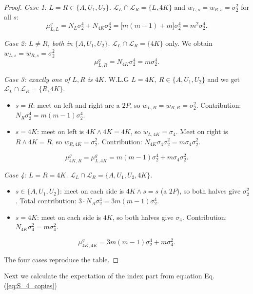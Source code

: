 \documentclass[12pt,a4paper]{article}
\begin{document}
\begin{proof}
\smallskip\noindent\emph{Case 1: $L=R\in\{A,U_{1},U_{2}\}$.}
$\mathcal L_{L}\cap\mathcal L_{R}=\{L,4K\}$ and $w_{L,s}=w_{R,s}=\sigma_{2}^{2}$ for all $s$:
\[
\mu^{g}_{L,L}=N_{L}\sigma_{2}^{4}+N_{4K}\sigma_{2}^{4}
=\bigl[m(m-1)+m\bigr]\sigma_{2}^{4}=m^{2}\sigma_{2}^{4}.
\]

\smallskip\noindent\emph{Case 2: $L\ne R$, both in $\{A,U_{1},U_{2}\}$.}
$\mathcal L_{L}\cap\mathcal L_{R}=\{4K\}$ only. We obtain $w_{L,s}=w_{R,s}=\sigma_{2}^{2}$
\[
\mu^{g}_{L,R}=N_{4K}\sigma_{2}^{4}=m\sigma_{2}^{4}.
\]

\smallskip\noindent\emph{Case 3: exactly one of $L,R$ is $4K$.}
W.L.G $L=4K,\ R\in\{A,U_{1},U_{2}\}$ and we get$\mathcal L_{L}\cap\mathcal L_{R}=\{R,4K\}$.
\begin{itemize}\setlength\itemsep{1pt}
  \item $s=R$: meet on left and right are a $2P$, so $w_{L,R}=w_{R,R}=\sigma_{2}^{2}$. Contribution: $N_{R}\sigma_{2}^{4}=m(m-1)\sigma_{2}^{4}$.
  \item $s=4K$: meet on left is $4K\wedge 4K=4K$, so $w_{L,4K}=\sigma_{4}$. Meet on right is $R\wedge 4K=R$, so $w_{R,4K}=\sigma_{2}^{2}$. Contribution: $N_{4K}\sigma_{4}\sigma_{2}^{2}=m\sigma_{4}\sigma_{2}^{2}$.
\end{itemize}
\[
\mu^{g}_{4K,R}=\mu_{L,4K}^g=m(m-1)\sigma_{2}^{4}+m\sigma_{4}\sigma_{2}^{2}.
\]

\smallskip\noindent\emph{Case 4: $L=R=4K$.}
$\mathcal L_{L}\cap\mathcal L_{R}=\{A,U_{1},U_{2},4K\}$.
\begin{itemize}\setlength\itemsep{1pt}
  \item $s\in\{A,U_{1},U_{2}\}$: meet on each side is $4K\wedge s=s$ (a $2P$), so both halves give $\sigma_{2}^{2}$. Total contribution: $3\cdot N_{A}\sigma_{2}^{4}=3m(m-1)\sigma_{2}^{4}$.
  \item $s=4K$: meet on each side is $4K$, so both halves give $\sigma_{4}$. Contribution: $N_{4K}\sigma_{4}^{2}=m\sigma_{4}^{2}$.
\end{itemize}
\[
\mu^{g}_{4K,4K}=3m(m-1)\sigma_{2}^{4}+m\sigma_{4}^{2}.
\]

The four cases reproduce the table.
\end{proof}
Next we calculate the expectation of the index part from equation Eq. (\ref{eq:S_4_copies})
\end{document}

